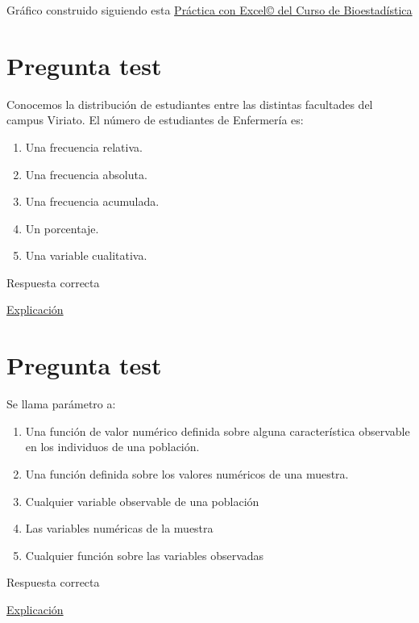 \documentclass[
]{book}
\providecommand{\tightlist}{%
  \setlength{\itemsep}{0pt}\setlength{\parskip}{0pt}}
\begin{document}
Gráfico construido siguiendo esta \href{https://1fjmanzano.github.io/bioestadistica/histogramas.html\#histogramas-con-excel-pr\%C3\%A1cticas}{Práctica con Excel© del Curso de Bioestadística}

\hypertarget{pregunta-test-24}{%
\section{Pregunta test}\label{pregunta-test-24}}

Conocemos la distribución de estudiantes entre las distintas facultades del campus Viriato. El número de estudiantes de Enfermería es:

\begin{enumerate}
\def\labelenumi{\alph{enumi})}
\tightlist
\item
  Una frecuencia relativa.
\item
  Una frecuencia absoluta.
\item
  Una frecuencia acumulada.
\item
  Un porcentaje.
\item
  Una variable cualitativa.
\end{enumerate}

Respuesta correcta

\href{https://1fjmanzano.github.io/bioestadistica/tablas-de-frecuencias.html}{Explicación}

\hypertarget{pregunta-test-25}{%
\section{Pregunta test}\label{pregunta-test-25}}

Se llama parámetro a:

\begin{enumerate}
\def\labelenumi{\alph{enumi})}
\tightlist
\item
  Una función de valor numérico definida sobre alguna característica observable en los individuos de una población.
\item
  Una función definida sobre los valores numéricos de una muestra.
\item
  Cualquier variable observable de una población
\item
  Las variables numéricas de la muestra
\item
  Cualquier función sobre las variables observadas
\end{enumerate}

Respuesta correcta

\href{https://1fjmanzano.github.io/bioestadistica/conceptos-previos.html}{Explicación}
\end{document}
